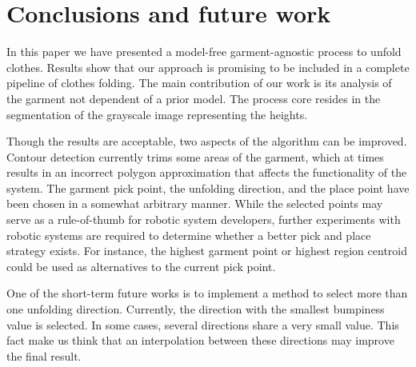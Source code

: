 \chapter{Conclusions and future work}
\label{conclusions_and_future_work}

In this paper we have presented a model-free garment-agnostic process to unfold clothes. Results show that our approach is promising to be included in a complete pipeline of clothes folding. The main contribution of our work is its analysis of the garment not dependent of a prior model. The process core resides in the segmentation of the grayscale image representing the heights.

Though the results are acceptable, two aspects of the algorithm can be improved.
Contour detection currently trims some areas of the garment, which at times results in an incorrect polygon approximation that affects the functionality of the system.
The garment pick point, the unfolding direction, and the place point have been chosen in a somewhat arbitrary manner. While the selected points may serve as a rule-of-thumb for robotic system developers, further experiments with robotic systems are required to determine whether a better pick and place strategy exists. For instance, the highest garment point or highest region centroid could be used as alternatives to the current pick point.



One of the short-term future works is to implement a method to select more than one unfolding direction. Currently, the direction with the smallest bumpiness value is selected. In some cases, several directions share a very small value. This fact make us think that an interpolation between these directions may improve the final result. 
